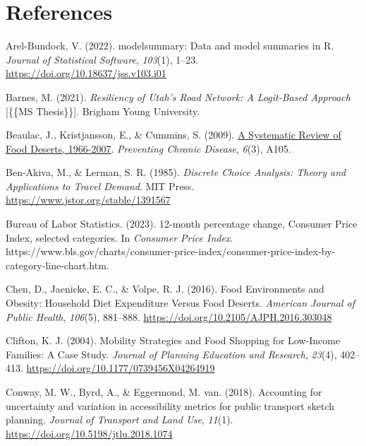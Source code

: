 \documentclass[
  letterpaper,
  number,
  review,
  3p]{elsarticle}
\newlength{\cslhangindent}
\newenvironment{CSLReferences}[2] %
 {\begin{list}{}{%
  \setlength{\itemindent}{0pt}
  \setlength{\leftmargin}{0pt}
  \setlength{\parsep}{0pt}
  \ifodd #1
   \setlength{\leftmargin}{\cslhangindent}
   \setlength{\itemindent}{-1\cslhangindent}
  \fi
  \setlength{\itemsep}{#2\baselineskip}}}
 {\end{list}}
\begin{document}

\section*{References}\label{references}


\label{refs}
\begin{CSLReferences}{1}{0}
Arel-Bundock, V. (2022). {modelsummary}: Data and model summaries in
{R}. \emph{Journal of Statistical Software}, \emph{103}(1), 1--23.
\url{https://doi.org/10.18637/jss.v103.i01}

Barnes, M. (2021). \emph{Resiliency of {Utah}'s {Road Network}: {A
Logit-Based Approach}} {[}\{\{MS Thesis\}\}{]}. Brigham Young
University.

Beaulac, J., Kristjansson, E., \& Cummins, S. (2009).
\href{https://www.ncbi.nlm.nih.gov/pmc/articles/PMC2722409}{A
{Systematic Review} of {Food Deserts}, 1966-2007}. \emph{Preventing
Chronic Disease}, \emph{6}(3), A105.

Ben-Akiva, M., \& Lerman, S. R. (1985). \emph{Discrete {Choice
Analysis}: {Theory} and {Applications} to {Travel Demand}}. MIT Press.
\url{https://www.jstor.org/stable/1391567}

Bureau of Labor Statistics. (2023). 12-month percentage change,
{Consumer Price Index}, selected categories. In \emph{Consumer Price
Index}.
https://www.bls.gov/charts/consumer-price-index/consumer-price-index-by-category-line-chart.htm.

Chen, D., Jaenicke, E. C., \& Volpe, R. J. (2016). Food {Environments}
and {Obesity}: {Household Diet Expenditure Versus Food Deserts}.
\emph{American Journal of Public Health}, \emph{106}(5), 881--888.
\url{https://doi.org/10.2105/AJPH.2016.303048}

Clifton, K. J. (2004). Mobility {Strategies} and {Food Shopping} for
{Low-Income Families}: {A Case Study}. \emph{Journal of Planning
Education and Research}, \emph{23}(4), 402--413.
\url{https://doi.org/10.1177/0739456X04264919}

Conway, M. W., Byrd, A., \& Eggermond, M. van. (2018). Accounting for
uncertainty and variation in accessibility metrics for public transport
sketch planning. \emph{Journal of Transport and Land Use}, \emph{11}(1).
\url{https://doi.org/10.5198/jtlu.2018.1074}


\end{CSLReferences}
\end{document}
